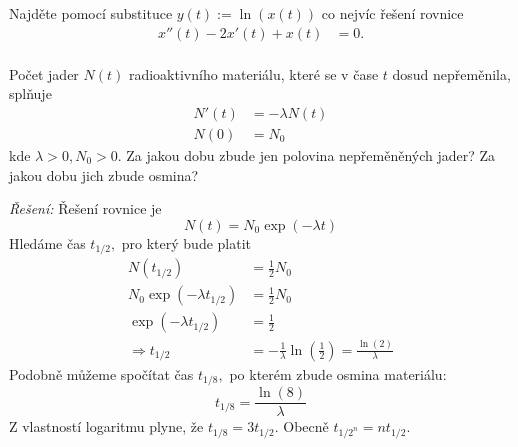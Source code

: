 \begin{úloha}
Najděte pomocí substituce $y(t):=\ln(x(t))$ co nejvíc řešení rovnice
\begin{align*}
	x''(t)-2x'(t)+x(t) &= 0. \\
\end{align*}
\end{úloha}

\begin{příklad}
  Počet jader $N(t)$ radioaktivního materiálu, které se v čase $t$ dosud nepřeměnila, splňuje
  \begin{align*}
  	N'(t) &= -\lambda N(t)\\
  	N(0) &= N_0
  \end{align*}
  kde $\lambda>0, N_0>0.$ Za jakou dobu zbude jen polovina nepřeměněných jader? Za jakou dobu jich zbude osmina?\par
  \textit{Řešení:} Řešení rovnice je
  \begin{equation*}
    N(t)=N_0\exp(-\lambda t)
  \end{equation*}
  Hledáme čas $t_{1/2},$ pro který bude platit
  \begin{align*}
	  N(t_{1/2})&=\frac{1}{2}N_0 \\
	  N_0 \exp(-\lambda t_{1/2})&= \frac{1}{2}N_0 \\
	  \exp(-\lambda t_{1/2})&= \frac{1}{2} \\
	  \Rightarrow  t_{1/2} &= -\frac{1}{\lambda}\ln\left(\frac{1}{2}\right)=\frac{\ln(2)}{\lambda}
  \end{align*}
  Podobně můžeme spočítat čas $t_{1/8},$ po kterém zbude osmina materiálu:
  \begin{equation*}
	  t_{1/8}=\frac{\ln(8)}{\lambda}
  \end{equation*}
  Z vlastností logaritmu plyne, že $t_{1/8}=3t_{1/2}.$ Obecně $t_{1/2^{n}}=n t_{1/2}.$
\end{příklad}

